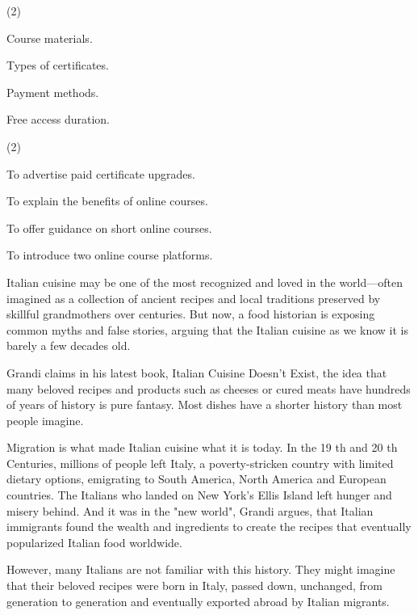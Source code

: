 \documentclass{英语试卷}
\begin{document}
\begin{choices}(2)
  \item Course materials.
  \item Types of certificates.
  \item Payment methods.
  \item Free access duration.
\end{choices}
\begin{choices}(2)
  \item To advertise paid certificate upgrades.
  \item To explain the benefits of online courses.
  \item To offer guidance on short online courses.
  \item To introduce two online course platforms.
\end{choices}
\par Italian cuisine may be one of the most recognized and loved in the world—often imagined as a collection of ancient recipes and local traditions preserved by skillful grandmothers over centuries. But now, a food historian is exposing common myths and false stories, arguing that the Italian cuisine as we know it is barely a few decades old.\par
\par Grandi claims in his latest book, Italian Cuisine Doesn't Exist, the idea that many beloved recipes and products such as cheeses or cured meats have hundreds of years of history is pure fantasy. Most dishes have a shorter history than most people imagine.\par
\par Migration is what made Italian cuisine what it is today. In the 19 th and 20 th Centuries, millions of people left Italy, a poverty-stricken country with limited dietary options, emigrating to South America, North America and European countries. The Italians who landed on New York's Ellis Island left hunger and misery behind. And it was in the "new world", Grandi argues, that Italian immigrants found the wealth and ingredients to create the recipes that eventually popularized Italian food worldwide.\par
\par However, many Italians are not familiar with this history. They might imagine that their beloved recipes were born in Italy, passed down, unchanged, from generation to generation and eventually exported abroad by Italian migrants.\par
\end{document}
